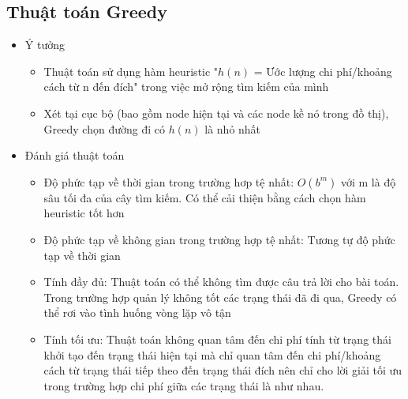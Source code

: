 \documentclass[a4paper, 12pt]{article}
\begin{document}
    \subsection{Thuật toán Greedy}
    \begin{itemize}
        \item Ý tưởng
        \begin{itemize}
            \item Thuật toán sử dụng hàm heuristic "$h(n)$ = Ước lượng chi phí/khoảng cách từ n đến đích" trong việc mở rộng tìm kiếm của mình
            \item Xét tại cục bộ (bao gồm node hiện tại và các node kề nó trong đồ thị), Greedy chọn đường đi có $h(n)$ là nhỏ nhất
        \end{itemize}
        \item Đánh giá thuật toán
        \begin{itemize}
            \item Độ phức tạp về thời gian trong trường hơp tệ nhất: $O(b^m)$ với m là độ sâu tối đa của cây tìm kiếm. Có thể cải thiện bằng cách chọn hàm heuristic tốt hơn
            \item Độ phức tạp về không gian trong trường hợp tệ nhất: Tương tự độ phức tạp về thời gian
            \item Tính đầy đủ: Thuật toán có thể không tìm được câu trả lời cho bài toán. Trong trường hợp quản lý không tốt các trạng thái đã đi qua, Greedy có thể rơi vào tình huống vòng lặp vô tận
            \item Tính tối ưu: Thuật toán không quan tâm đến chi phí tính từ trạng thái khởi tạo đến trạng thái hiện tại mà chỉ quan tâm đến chi phí/khoảng cách từ trạng thái tiếp theo đến trạng thái đích nên chỉ cho lời giải tối ưu trong trường hợp chi phí giữa các trạng thái là như nhau.
        \end{itemize}
    \end{itemize}
    \clearpage
\end{document}

